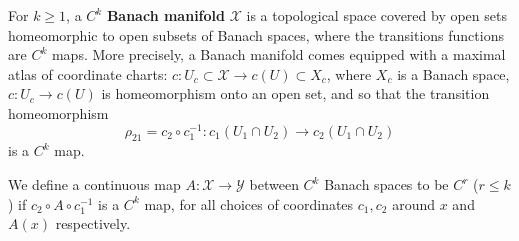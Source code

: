 \documentclass{amsart}
\begin{document}
\begin{defn}
  For $k\ge 1$, a $C^{k}$ \textbf{Banach manifold} $\mathscr{X}$ is a topological space covered by open sets homeomorphic to open subsets of Banach spaces, where the transitions functions are $C^{k}$ maps. More precisely, a Banach manifold comes equipped with a maximal atlas of coordinate charts: $c:U_{c}\subset \mathscr{X}\to c(U)\subset X_{c}$, where $X_{c}$ is a Banach space, $c:U_{c}\to c(U)$ is homeomorphism onto an open set, and so that the transition homeomorphism
  \begin{equation*}
    \rho_{21}=c_{2}\circ c_{1}^{-1}:c_{1}(U_{1}\cap U_{2})\to c_{2}(U_{1}\cap U_{2})
  \end{equation*}
  is a $C^{k}$ map.

  We define a continuous map $A:\mathscr{X}\to \mathscr{Y}$ between $C^{k}$ Banach spaces to be $C^{r}$ ($r\le k$) if $c_{2}\circ A\circ c_{1}^{-1}$ is a $C^{k}$ map, for all choices of coordinates $c_{1},c_{2}$ around $x$ and $A(x)$ respectively. 
\end{defn}
\end{document}
